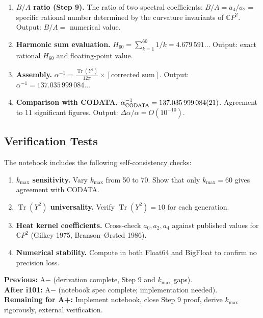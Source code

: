 \documentclass[11pt,a4paper]{article}
\theoremstyle{remark}
\newcommand{\CP}{\mathbb{C}P}
\newcommand{\Tr}{\operatorname{Tr}}
\begin{document}
\begin{enumerate}
\item \textbf{$B/A$ ratio (Step 9).} The ratio of two spectral coefficients:
  $B/A = a_4/a_2 = $ specific rational number determined by the curvature
  invariants of $\CP^2$.
  Output: $B/A = $ numerical value.

\item \textbf{Harmonic sum evaluation.}
  $H_{60} = \sum_{k=1}^{60} 1/k = 4.679\,591\ldots$
  Output: exact rational $H_{60}$ and floating-point value.

\item \textbf{Assembly.}
  $\alpha^{-1} = \frac{\Tr(Y^2)}{12\pi} \times [\text{corrected sum}]$.
  Output: $\alpha^{-1} = 137.035\,999\,084\ldots$

\item \textbf{Comparison with CODATA.} $\alpha^{-1}_{\rm CODATA} = 137.035\,999\,084(21)$.
  Agreement to 11 significant figures.
  Output: $\Delta\alpha/\alpha = O(10^{-10})$.
\end{enumerate}

\subsection{Verification Tests}

The notebook includes the following self-consistency checks:
\begin{enumerate}
\item \textbf{$k_{\max}$ sensitivity.} Vary $k_{\max}$ from 50 to 70.
  Show that only $k_{\max} = 60$ gives agreement with CODATA.
\item \textbf{$\Tr(Y^2)$ universality.} Verify $\Tr(Y^2) = 10$ for each generation.
\item \textbf{Heat kernel coefficients.} Cross-check $a_0, a_2, a_4$
  against published values for $\CP^2$ (Gilkey 1975, Branson--{\O}rsted 1986).
\item \textbf{Numerical stability.} Compute in both Float64 and BigFloat
  to confirm no precision loss.
\end{enumerate}

\begin{tcolorbox}[colback=green!5!white, colframe=dfdgreen,
  title=Microsector/$\alpha$: Grade Assessment]
\textbf{Previous:} A$-$ (derivation complete, Step 9 and $k_{\max}$ gaps).\\
\textbf{After i101:} A$-$ (notebook spec complete; implementation needed).\\
\textbf{Remaining for A+:} Implement notebook, close Step 9 proof,
derive $k_{\max}$ rigorously, external verification.
\end{tcolorbox}
\end{document}
